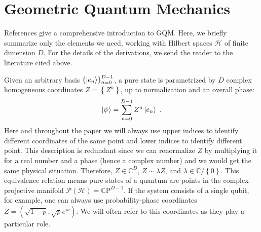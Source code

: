 \documentclass[draft,nofootinbib,pre,twocolumn,showpacs,showkeys,preprintnumbers,floatfix]{revtex4-1}
\newcommand{\1}{\mathbbm{1}}
\begin{document}






\section{Geometric Quantum Mechanics}
\label{sec:GQM}

References
\cite{STROCCHI1966,Miel68,Kibble1979,Heslot1985,Page87,And90,Gibbons1992,Ashtekar1995,Ashtekar1999,Brody2001,Bengtsson2017,Carinena2007,Chruscinski2006,Marmo2010,Avron2020,Pastorello2015,Pastorello2015a,Pastorello2016,Clemente-Gallardo2013}
give a comprehensive introduction to GQM. Here, we briefly summarize only the
elements we need, working with Hilbert spaces $\mathcal{H}$ of finite dimension $D$.
For the details of the derivations, we send the reader to the literature cited above.

Given an arbitrary basis $\left\{\ket{e_n} \right\}_{n=0}^{D-1}$, a pure state is
parametrized by $D$ complex homogeneous coordinates $Z = \left\{      Z^n\right\}$, up to
normalization and an overall phase:
\begin{align*}
\ket{\psi} = \sum_{n=0}^{D-1} Z^n \ket{e_n}~.
\end{align*}
Here and throughout the paper we will always use upper indices to identify different 
coordinates of the same point and lower indices to identify different point. This 
description is redundant since we can renormalize $Z$ by multiplying it for a real number
and a phase (hence a complex number) and we would get the same physical situation. Therefore, 
$Z \in \mathbb{C}^{D}$, $Z \sim \lambda Z$, and $\lambda \in \mathbb{C}/\left\{ 0\right\}$. This equivalence 
relation means pure states of a quantum are points in the complex projective manifold $\mathcal{P}\left(
\mathcal{H} \right)=\mathbb{C}\mathrm{P}^{D-1}$. If the system consists of a single qubit, for
example, one can always use probability-phase coordinates $Z = (\sqrt{1-p},\sqrt{p} e^{i\nu})$.
We will often refer to this coordinates as they play a particular role.
\end{document}
